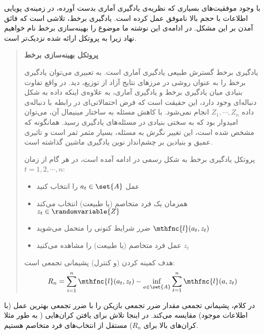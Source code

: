 
با وجود موفقیت‌های بسیاری که نظریه‌ی یادگیری آماری بدست آورده، در زمینه‌ی پویایی اطلاعات با حجم بالا
ناموفق عمل کرده است. یادگیری برخط، تلاشی است که فائق آمدن بر این مشکل. در ادامه‌ی این نوشته ما موضوع را بهینه‌سازی برخط نام خواهیم نهاد زیرا به پروتکل ارائه شده نزدیک‌تر است.



\begin{quote}
{\bf
پروتکل بهینه‌سازی برخط
}

یادگیری برخط گسترش طبیعی یادگیری آماری است. به تعبیری می‌توان یادگیری برخط را به عنوان روشی در مرزهای نتایج آزاد از توزیع، دید. در واقع تفاوت بنیادی میان یادگیری برخط و یادگیری آماری، به علاوه‌ی اینکه داده به شکل دنباله‌ای وجود دارد، این حقیقت است که فرض احتمالاتی‌ای در رابطه با دنباله‌ی داده 
$Z_1, \cdots, Z_n$ 
انجام نمی‌شود. با کاهش مسئله به ساختار مینیمال
آن، می‌توان امیدوار بود که به سختی بنیادی در مسئله‌های یادگیری رسید. همانگونه که مشخص شده است، این تغییر نگرش به مسئله، بسیار مثمر ثمر است و تاثیری عمیق و بنیادین بر چشم‌انداز نوین یادگیری ماشین گذاشته است.


پروتکل یادگیری برخط به شکل رسمی در ادامه آمده است، در هر گام از زمان 
$t = 1, 2, \cdots, n$: 

\begin{itemize}
\item
عمل 
$a_t \in \set{A}$ 
را انتخاب کنید

\item
همزمان یک فرد متخاصم
(یا طبیعت) انتخاب می‌کند
$z_t \in \randomvariable{Z}$

\item
ضرر شرایط کنونی را متحمل می‌شوید 
$\mthfnc{l}(a_t, z_t)$

\item
عمل فرد متخاصم (یا طبیعت) را مشاهده می‌کنید 
$z_t$

\end{itemize}

هدف کمینه کردن (و کنترل) پشیمانی
تجمعی است:
\[
R_n = \sum^{n}_{i = 1} \mthfnc{l}(a_t,z_t) - \inf_{a \in \set{A}} \sum^{n}_{t=1} \mthfnc{l}(a,z_t)
\]

\end{quote}

در کلام، پشیمانی تجمعی مقدار ضرر تجمعی بازیکن را با ضرر تجمعی بهترین عمل (با اطلاعات موجود) مقایسه می‌کند. در اینجا تلاش برای یافتن کران‌هایی ( به طور مثلا کران‌های بالا برای 
$R_n$) 
مستقل از انتخاب‌های فرد متخاصم هستیم.

